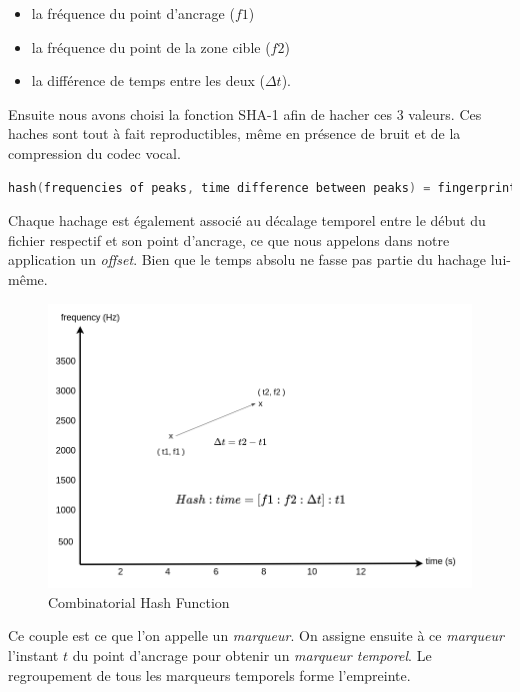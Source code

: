 \documentclass[11pt, report, french]{scrreprt}
\begin{document}
\begin{itemize}
	\item la fréquence du point d’ancrage ($f1$)
	\item la fréquence du point de la zone cible ($f2$)
	\item la différence de temps entre les deux ($\Delta t$).
\end{itemize}

\vspace{0.5cm}
Ensuite nous avons choisi la fonction SHA-1 afin de hacher ces 3 valeurs.
Ces haches sont tout à fait reproductibles, même en présence de bruit et de la compression du codec vocal.\\

\begin{lstlisting}[language=C]
hash(frequencies of peaks, time difference between peaks) = fingerprint hash value
\end{lstlisting}

\vspace{0.5cm}
Chaque hachage est également associé au décalage temporel entre le début du fichier respectif et son point d'ancrage, ce que nous appelons dans notre application un \textit{offset}. Bien que le temps absolu ne fasse pas partie du hachage lui-même. 

\begin{figure}[H]
	\centering
	\includegraphics[scale=0.45]{img/hash_algo.png}
	\caption{Combinatorial Hash Function}
\end{figure}

Ce couple est ce que l’on appelle un \textit{marqueur}. On assigne ensuite à ce \textit{marqueur} l’instant $t$ du point d’ancrage pour obtenir un \textit{marqueur temporel}. Le regroupement de tous les marqueurs temporels forme l’empreinte.\\
\end{document}
